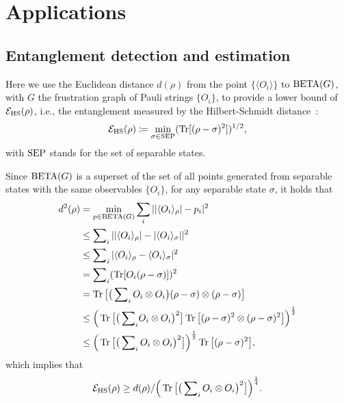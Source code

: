 


\section{Applications}
\label{sec:app2}
\subsection{Entanglement detection and estimation}
\label{ssec:entanglement}
Here we use the Euclidean distance $d(\rho)$ from the point $\{\langle O_i\rangle\}$ to {$\operatorname{BETA}(G)$, with $G$ the frustration graph of Pauli strings $\{O_i\}$}, to provide a lower bound of ${\cal E}_{\rm HS}(\rho)$, i.e., the entanglement measured by the Hilbert-Schmidt distance~\cite{witte1999new}:
\begin{equation}
    {\cal E}_{\rm HS}(\rho) \coloneqq \min_{\sigma \in {\rm SEP}} (\operatorname{Tr}[(\rho-\sigma)^2])^{1/2},
\end{equation}
with ${\rm SEP}$ stands for the set of separable states.

Since $\operatorname{BETA}(G)$ is a superset of the set of all points generated from separable states with the same observables $\{O_i\}$, for any separable state $\sigma$, it holds that
\begin{align}
	d^2(\rho) &= \min_{p\in \operatorname{BETA}(G)} \sum_i ||\langle O_i\rangle_{\rho}| - p_i |^2 \nonumber\\
    &\le \sum\nolimits_i ||\langle O_i\rangle_{\rho}| - |\langle O_i\rangle_{\sigma}| |^2 \nonumber\\
            &\le \sum\nolimits_i |\langle O_i\rangle_{\rho} - \langle O_i\rangle_{\sigma} |^2 \nonumber\\
	    &= \sum\nolimits_i (\operatorname{Tr}[O_i (\rho - \sigma)])^2 \nonumber\\
	    &= \operatorname{Tr}\big[ \big(\sum\nolimits_i O_i\otimes O_i\big) (\rho-\sigma)\otimes(\rho-\sigma)  \big]\nonumber\\
	    &\le \Big(\operatorname{Tr}\big[ \big(\sum\nolimits_i\! O_i\otimes O_i\big)^2\big] \operatorname{Tr}\big[ (\rho-\sigma)^2\otimes(\rho-\sigma)^2  \big] \Big)^{\frac{1}{2}}\nonumber\\
	    &\le \Big(\operatorname{Tr}\big[ \big(\sum\nolimits_i O_i\otimes O_i\big)^2\big] \Big)^{\frac12}\operatorname{Tr}\big[ (\rho-\sigma)^2\big] ,
\end{align}
which implies that
\begin{equation}
	{\cal E}_{\rm HS}(\rho) \ge d(\rho) / \Big(\operatorname{Tr}\big[ \big(\sum\nolimits_i O_i\otimes O_i\big)^2\big] \Big)^{\frac{1}{4}}.
\end{equation}

